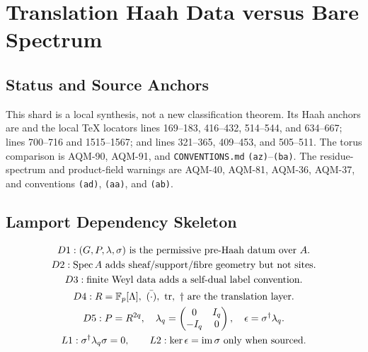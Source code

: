 
\section{Translation Haah Data versus Bare Spectrum}
\label{sec:translation-haah-data-versus-bare-spectrum}

\subsection{Status and Source Anchors}

This shard is a local synthesis, not a new classification theorem.  Its Haah
anchors are  and the
local TeX locators
lines 169--183, 416--432, 514--544, and 634--667;
lines 700--716 and 1515--1567; and
lines 321--365, 409--453, and 505--511.  The torus comparison is AQM-90,
AQM-91, and \texttt{CONVENTIONS.md} \texttt{(az)}--\texttt{(ba)}.  The
residue-spectrum and product-field warnings are AQM-40, AQM-81, AQM-36,
AQM-37, and conventions \texttt{(ad)}, \texttt{(aa)}, and \texttt{(ab)}.

\subsection{Lamport Dependency Skeleton}
\[
\begin{gathered}
D1:(G,P,\lambda,\sigma)\text{ is the permissive pre-Haah datum over }A.\\
D2:\operatorname{Spec} A\text{ adds sheaf/support/fibre geometry but not sites.}\\
D3:\text{finite Weyl data adds a self-dual label convention.}\\
D4:R=\mathbb F_p[\Lambda],\ \bar{(\cdot)},\ \operatorname{tr},\ \dagger
   \text{ are the translation layer.}\\
D5:P=R^{2q},\quad
\lambda_q=\begin{pmatrix}0&I_q\\-I_q&0\end{pmatrix},\quad
\epsilon=\sigma^\dagger\lambda_q.\\
L1:\sigma^\dagger\lambda_q\sigma=0,\qquad
L2:\ker\epsilon=\operatorname{im}\sigma\text{ only when sourced.}
\end{gathered}
\]

